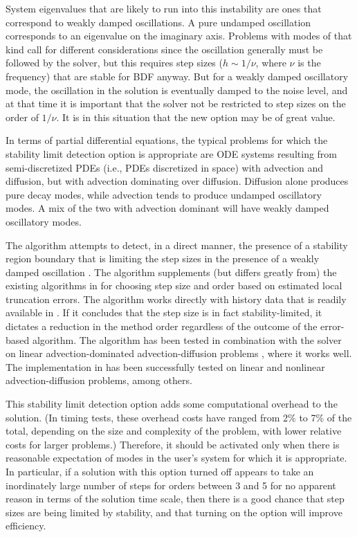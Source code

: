System eigenvalues that are likely to run into this instability are
ones that correspond to weakly damped oscillations.  A pure undamped
oscillation corresponds to an eigenvalue on the imaginary axis.
Problems with modes of that kind call for different considerations
since the oscillation generally must be followed by the solver, but
this requires step sizes ($h \sim 1/\nu$, where $\nu$ is the frequency) 
that are stable for BDF anyway.  But for a weakly damped oscillatory mode,
the oscillation in the solution is eventually damped to the noise level, 
and at that time it is important that the solver not be restricted to step 
sizes on the order of $1/\nu$.  It is in this situation that the new option may
be of great value.

In terms of partial differential equations, the typical problems for
which the stability limit detection option is appropriate are
ODE systems resulting from semi-discretized PDEs (i.e., PDEs
discretized in space) with advection and diffusion, but with advection dominating
over diffusion. Diffusion alone produces pure decay modes, while advection tends to
produce undamped oscillatory modes.  A mix of the two with advection
dominant will have weakly damped oscillatory modes.

The {\stald} algorithm attempts to detect, in a direct
manner, the presence of a stability region boundary that is limiting
the step sizes in the presence of a weakly damped oscillation \cite{Hin:92}.
The algorithm supplements (but differs greatly from) the existing
algorithms in {\cvodes} for choosing step size and order based on
estimated local truncation errors.  The {\stald} algorithm works directly
with history data that is readily available in {\cvodes}.  If it concludes
that the step size is in fact stability-limited, it dictates a
reduction in the method order regardless of the outcome of the
error-based algorithm.  The {\stald} algorithm has been tested in
combination with the {\vode} solver on linear advection-dominated
advection-diffusion problems \cite{Hin:95}, where it works well.  The
implementation in {\cvodes} has been successfully tested on linear 
and nonlinear advection-diffusion problems, among others.

This stability limit detection option adds some computational overhead
to the {\cvodes} solution.  (In timing tests, these overhead costs
have ranged from 2\% to 7\% of the total, depending on the size and
complexity of the problem, with lower relative costs for larger
problems.)  Therefore, it should be activated only when there is
reasonable expectation of modes in the user's system for which it is
appropriate.  In particular, if a {\cvodes} solution with this option
turned off appears to take an inordinately large number of steps for
orders between 3 and 5 for no apparent reason in terms of the solution time scale,
then there is a good chance that step sizes are being limited by
stability, and that turning on the option will improve efficiency.

